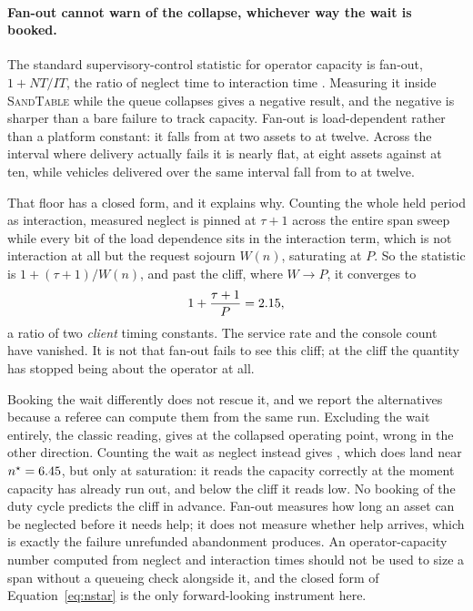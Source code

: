 \documentclass[11pt]{article}
\newcommand{\sandtable}{\textsc{SandTable}}
\begin{document}
\paragraph{Fan-out cannot warn of the collapse, whichever way the wait is booked.} The standard supervisory-control statistic for operator capacity is fan-out, $1 + NT/IT$, the ratio of neglect time to interaction time \citep{olsen2004fanout,cummings2008predicting}. Measuring it inside \sandtable{} while the queue collapses gives a negative result, and the negative is sharper than a bare failure to track capacity. Fan-out is load-dependent rather than a platform constant: it falls from \qFanTwo{} at two assets to \qFanTwelve{} at twelve. Across the interval where delivery actually fails it is nearly flat, \qFanEight{} at eight assets against \qFanTen{} at ten, while vehicles delivered over the same interval fall from \qArrivedEight{} to \qArrivedTwelve{} at twelve.

That floor has a closed form, and it explains why. Counting the whole held period as interaction, measured neglect is pinned at $\tau + 1$ across the entire span sweep while every bit of the load dependence sits in the interaction term, which is not interaction at all but the request sojourn $W(n)$, saturating at $P$. So the statistic is $1 + (\tau+1)/W(n)$, and past the cliff, where $W \to P$, it converges to
\[
1 + \frac{\tau + 1}{P} = 2.15{},
\]
a ratio of two \emph{client} timing constants. The service rate and the console count have vanished. It is not that fan-out fails to see this cliff; at the cliff the quantity has stopped being about the operator at all.

Booking the wait differently does not rescue it, and we report the alternatives because a referee can compute them from the same run. Excluding the wait entirely, the classic reading, gives \qFanClassic{} at the collapsed operating point, wrong in the other direction. Counting the wait as neglect instead gives \qFanUtil{}, which does land near $n^{\star} = 6.45{}$, but only at saturation: it reads the capacity correctly at the moment capacity has already run out, and below the cliff it reads low. No booking of the duty cycle predicts the cliff in advance. Fan-out measures how long an asset can be neglected before it needs help; it does not measure whether help arrives, which is exactly the failure unrefunded abandonment produces. An operator-capacity number computed from neglect and interaction times should not be used to size a span without a queueing check alongside it, and the closed form of Equation~\ref{eq:nstar} is the only forward-looking instrument here.
\end{document}
